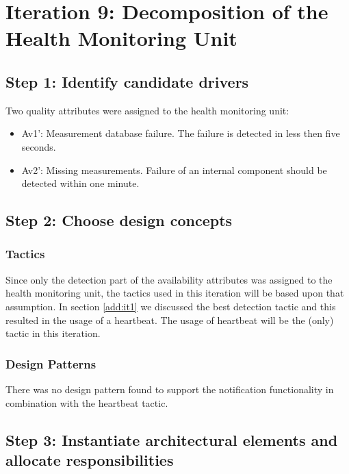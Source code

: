 \section{Iteration 9: Decomposition of the Health Monitoring Unit}
\label{add:it9}

\subsection{Step 1: Identify candidate drivers}
\label{add:it9/drivers}

\npar Two quality attributes were assigned to the health monitoring unit:

\begin{itemize}
  	\item Av1': Measurement database failure. The failure is detected in less then five seconds.
  	\item Av2': Missing measurements. Failure of an internal component should be
  	detected within one minute.
\end{itemize}

\subsection{Step 2: Choose design concepts}
\label{add:it9/concepts}

\subsubsection{Tactics}
\label{add:it9/tactics}

\npar Since only the detection part of the availability attributes was assigned
to the health monitoring unit, the tactics used in this iteration will be based
upon that assumption. In section \ref{add:it1} we discussed the best detection
tactic and this resulted in the usage of a heartbeat. The usage of heartbeat
will be the (only) tactic in this iteration.

\subsubsection{Design Patterns}
\label{add:it9/patterns}

\npar There was no design pattern found to support the notification
functionality in combination with the heartbeat tactic.

\subsection{Step 3: Instantiate architectural elements and allocate responsibilities}
\label{add:it9/elements}

